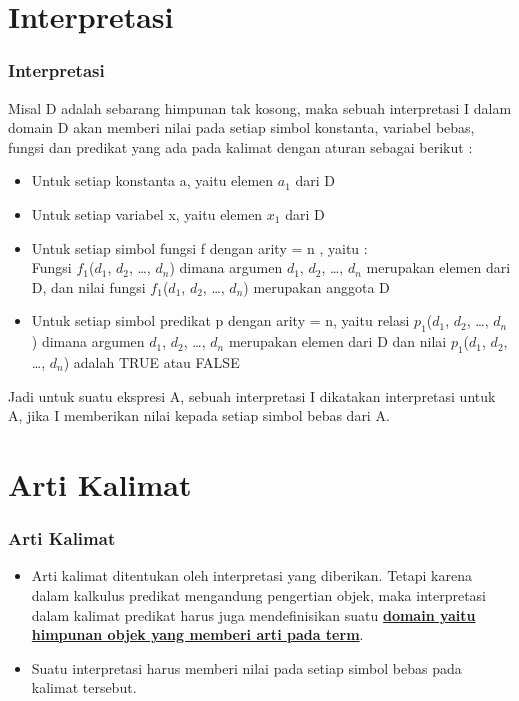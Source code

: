 \documentclass[handout]{beamer}
\theoremstyle{definition}
\theoremstyle{example}
\begin{document}
\section{Interpretasi}
\begin{frame}
	\frametitle{Interpretasi}
	 Misal D adalah sebarang himpunan tak kosong, maka sebuah interpretasi I dalam domain D akan memberi nilai pada setiap simbol konstanta,	variabel bebas, fungsi dan predikat yang ada pada kalimat dengan aturan sebagai berikut :\\
	 \begin{itemize}
	 	\item Untuk setiap konstanta a, yaitu elemen $a_1$ dari D
	 	\item Untuk setiap variabel x, yaitu elemen $x_1$ dari D
	 	\item Untuk setiap simbol fungsi f dengan arity = n , yaitu :\\
	 	Fungsi $f_1$($d_1$, $d_2$, …, $d_n$) dimana argumen $d_1$, $d_2$, …, $d_n$ merupakan elemen dari D, dan nilai fungsi $f_1$($d_1$, $d_2$, …, $d_n$) merupakan anggota D
	 	\item Untuk setiap simbol predikat p dengan arity = n, yaitu relasi $p_1$($d_1$, $d_2$, …, $d_n$) dimana argumen $d_1$, $d_2$, …, $d_n$ merupakan elemen dari D dan nilai $p_1$($d_1$, $d_2$, …, $d_n$) adalah TRUE atau FALSE
	 \end{itemize}
	  Jadi untuk suatu ekspresi A, sebuah interpretasi I dikatakan interpretasi untuk A, jika I memberikan nilai kepada setiap simbol bebas dari A. 
	
\end{frame}	

\section{Arti Kalimat}
\begin{frame}
	\frametitle{Arti Kalimat}
	\begin{itemize}
		\item Arti kalimat ditentukan oleh interpretasi yang diberikan. Tetapi karena dalam kalkulus predikat mengandung pengertian objek, maka interpretasi dalam kalimat predikat harus juga mendefinisikan suatu \textbf{\underline{domain yaitu himpunan objek yang memberi arti pada term}}.
		\item Suatu interpretasi harus memberi nilai pada setiap simbol bebas pada kalimat tersebut.
	\end{itemize}
	
	
\end{frame}	
\end{document}
